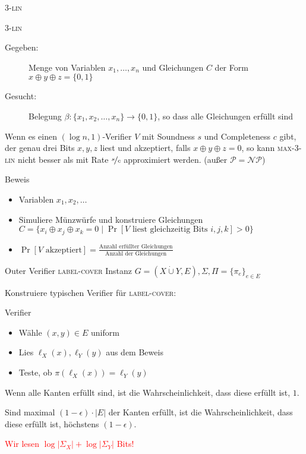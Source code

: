 \documentclass[table,german,10pt]{beamer}
\newcommand{\red}[1]{\textcolor{red}{#1}}
\begin{document}
\begin{frame}{\textsc{3-lin}}
  \begin{block}{\textsc{3-lin}}
  \begin{description}
  \item[Gegeben:] Menge von Variablen $x_{1},\ldots,x_{n}$ und
    Gleichungen $C$ der Form $x\oplus y\oplus z=\{0,1\}$
  \item[Gesucht:] Belegung $\beta\colon\{x_{1},x_{2},\ldots,x_{n}\}\to
    \{0,1\}$, so dass alle Gleichungen erfüllt sind
  \end{description}
  \end{block}  
\pause
\begin{theorem}
  Wenn es einen $(\log n,1)$-Verifier $V$ mit Soundness $s$ und
  Completeness $c$ gibt, der genau drei Bits $x,y,z$ liest und
  akzeptiert, falls $x\oplus y\oplus z=0$, so kann \textsc{max-3-lin} nicht besser
  als mit Rate $\nicefrac{s}{c}$ approximiert werden. (außer
  $\mathcal{P}=\mathcal{NP}$)
\end{theorem}
\pause
\begin{block}{Beweis}
  \begin{itemize}[<+->]
  \item Variablen $x_{1},x_{2},\ldots$
  \item Simuliere Münzwürfe und konstruiere Gleichungen $C=\{
    x_{i}\oplus x_{j} \oplus x_{k}=0\mid \Pr[\text{$V$ liest gleichzeitig Bits
      $i,j,k$}]>0\}$
  \item $\Pr[\text{$V$ akzeptiert}]=\frac{\text{Anzahl erfüllter
        Gleichungen}}{\text{Anzahl der Gleichungen}}$
  \end{itemize}
\end{block}

\end{frame}
\begin{frame}{Outer Verifier}
\textsc{label-cover} Instanz
      $G=(X\dot{\cup}Y,E),\Sigma,\Pi=\{\pi_{e}\}_{e\in E}$

Konstruiere typischen Verifier für \textsc{label-cover}:

\pause
\begin{block}{Verifier}
  

\begin{itemize}[<+->]
\item Wähle $(x,y)\in E$ uniform
\item Lies $\ell_{X}(x),\ell_{Y}(y)$ aus dem Beweis
\item Teste, ob $\pi(\ell_{X}(x))=\ell_{Y}(y)$ 
\end{itemize}
\end{block}

\pause
Wenn alle Kanten erfüllt sind, ist die
Wahrscheinlichkeit, dass diese erfüllt ist, $1$.
\pause

Sind maximal $(1-\epsilon)\cdot |E|$ der Kanten erfüllt, ist die
Wahrscheinlichkeit, dass diese erfüllt ist, höchstens $(1-\epsilon)$. 

\pause
\red{Wir lesen $\log|\Sigma_{X}|+\log|\Sigma_{Y}|$ Bits!}

  
\end{frame}
\end{document}
